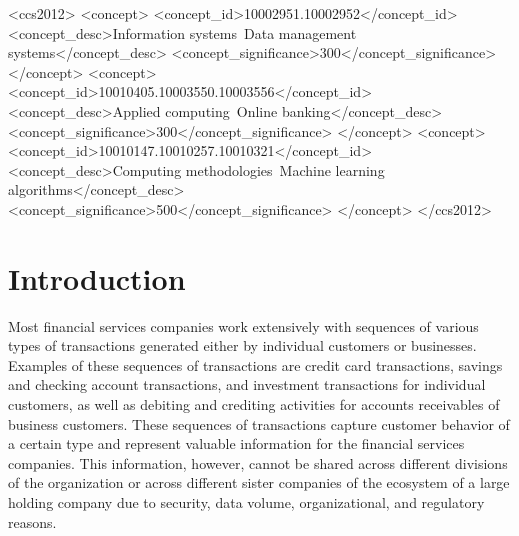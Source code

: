 \documentclass[sigconf, anonymous]{acmart}
\begin{document}
\begin{CCSXML}
<ccs2012>
   <concept>
       <concept_id>10002951.10002952</concept_id>
       <concept_desc>Information systems~Data management systems</concept_desc>
       <concept_significance>300</concept_significance>
       </concept>
   <concept>
       <concept_id>10010405.10003550.10003556</concept_id>
       <concept_desc>Applied computing~Online banking</concept_desc>
       <concept_significance>300</concept_significance>
       </concept>
   <concept>
       <concept_id>10010147.10010257.10010321</concept_id>
       <concept_desc>Computing methodologies~Machine learning algorithms</concept_desc>
       <concept_significance>500</concept_significance>
       </concept>
 </ccs2012>
\end{CCSXML}



\maketitle

\section{Introduction} \label{sec-intro}

Most financial services companies work extensively with sequences of various types of transactions generated either by individual customers or businesses. Examples of these sequences of transactions are credit card transactions, savings and checking account transactions, and investment transactions for individual customers, as well as debiting and crediting activities for accounts receivables of business customers. These sequences of transactions capture customer behavior of a certain type and represent valuable information for the financial services companies. This information, however, cannot be shared across different divisions of the organization or across different sister companies of the ecosystem of a large holding company due to security, data volume, organizational, and regulatory reasons. 
\end{document}
